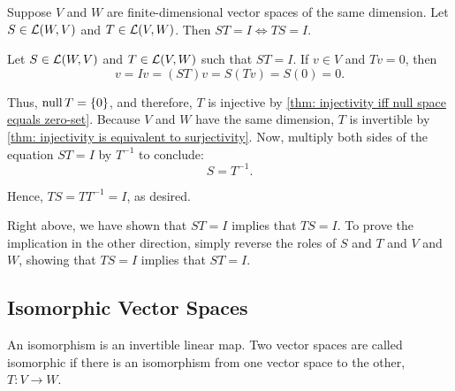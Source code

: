   \setcounter{thm}{67}
  \begin{thm} [$ST = I \iff TS=I$ on vector spaces of the same dimension]
    \label{thm: ST = I iff TS=I - on vector spaces of the same dimension}
    Suppose $V$ and $W$ are finite-dimensional vector spaces of the same dimension. Let $S \in \mathcal{L} (W,V)$ and $T \in \mathcal{L}(V,W)$. Then $ST = I \iff TS = I$.
  \end{thm}
  \begin{prf}
     \Rightarrowdirection Let $S \in \mathcal{L} (W,V)$ and $T \in \mathcal{L}(V,W)$ such that $ST = I$. If $v \in V$ and $Tv = 0$, then
     \begin{equation}
       v = Iv = (ST)v = S(Tv) = S(0) = 0.
     \end{equation}

     Thus, $\operatorname{null} T = \{0\}$, and therefore, $T$ is injective by \ref{thm: injectivity iff null space equals zero-set}. Because $V$ and $W$ have the same dimension, $T$ is invertible by \ref{thm: injectivity is equivalent to surjectivity}. Now, multiply both sides of the equation $ST = I$ by $T^{-1}$ to conclude:
     \begin{equation}
       S = T^{-1}.
     \end{equation}

     Hence, $TS = TT^{-1} = I$, as desired.

     \Leftarrowdirection Right above, we have shown that $ST = I$ implies that $TS=I$. To prove the implication in the other direction, simply reverse the roles of $S$ and $T$ and $V$ and $W$, showing that $TS=I$ implies that $ST=I$.
  \end{prf}

  \subsection{Isomorphic Vector Spaces}

  \begin{mydef}
    An isomorphism is an invertible linear map. Two vector spaces are called isomorphic if there is an isomorphism from one vector space to the other, $T:V\to W$.
  \end{mydef}

